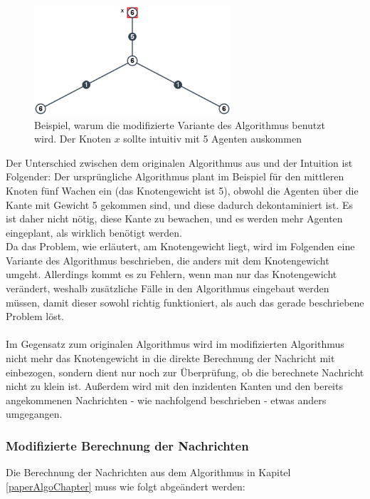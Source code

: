 		\begin{figure}[htb]
			\includegraphics[width=0.65\textwidth]{bilder/abb_paper_problem.png}
			\captionsetup{width=0.65\textwidth}
			\caption{Beispiel, warum die modifizierte Variante des Algorithmus benutzt wird. Der Knoten $x$ sollte intuitiv mit 5 Agenten auskommen}
			\label{fig:negBeispielPaperAlgo}
		\end{figure}

Der Unterschied zwischen dem originalen Algorithmus aus \cite{cima_paper} und der Intuition ist Folgender: Der ursprüngliche Algorithmus plant im Beispiel für den mittleren Knoten fünf Wachen ein (das Knotengewicht ist 5), obwohl die Agenten über die Kante mit Gewicht 5 gekommen sind, und diese dadurch dekontaminiert ist. Es ist daher nicht nötig, diese Kante zu bewachen, und es werden mehr Agenten eingeplant, als wirklich benötigt werden.
\\
Da das Problem, wie erläutert, am Knotengewicht liegt, wird im Folgenden eine Variante des Algorithmus beschrieben, die anders mit dem Knotengewicht umgeht. Allerdings kommt es zu Fehlern, wenn man nur das Knotengewicht verändert, weshalb zusätzliche Fälle in den Algorithmus eingebaut werden müssen, damit dieser sowohl richtig funktioniert, als auch das gerade beschriebene Problem löst.
\\
\\
Im Gegensatz zum originalen Algorithmus \cite{cima_paper} wird im modifizierten Algorithmus nicht mehr das Knotengewicht in die direkte Berechnung der Nachricht mit einbezogen, sondern dient nur noch zur Überprüfung, ob die berechnete Nachricht nicht zu klein ist. Außerdem wird mit den inzidenten Kanten und den bereits angekommenen Nachrichten - wie nachfolgend beschrieben - etwas anders umgegangen.

\subsubsection{Modifizierte Berechnung der Nachrichten}

Die Berechnung der Nachrichten aus dem Algorithmus in Kapitel \ref{paperAlgoChapter} muss wie folgt abgeändert werden:

